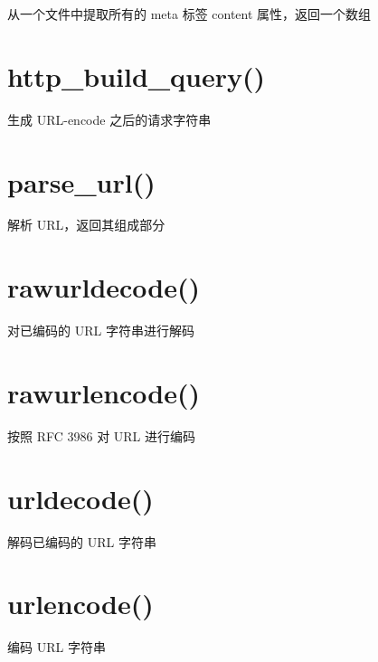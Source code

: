 从一个文件中提取所有的 meta 标签 content 属性，返回一个数组

\section{http\_build\_query()}

生成 URL-encode 之后的请求字符串

\section{parse\_url()}

解析 URL，返回其组成部分

\section{rawurldecode()}

对已编码的 URL 字符串进行解码

\section{rawurlencode()}

按照 RFC 3986 对 URL 进行编码

\section{urldecode()}

解码已编码的 URL 字符串

\section{urlencode()}

编码 URL 字符串








